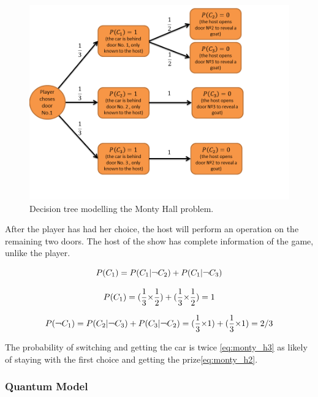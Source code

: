 \begin{figure}[h]
\centering 
\includegraphics[scale=0.35]{Figures/monty_hall_decision_tree.png}
\caption{Decision tree modelling the Monty Hall problem. }
\label{fig:monty_hall_tree}
\end{figure}

After the player has had her choice, the host will perform an operation on the remaining two doors. The host of the show has complete information of the game, unlike the player.

\begin{equation}
\label{eq:monty_h1}
P(C_{1})=P(C_{1}|\text{\textlnot}C_{2})+P(C_{1}|\text{\textlnot}C_{3})
\end{equation}


\begin{equation}
\label{eq:monty_h2}
P(C_{1})=(\frac{1}{3}\text{\texttimes}\frac{1}{2})+(\frac{1}{3}\text{\texttimes}\frac{1}{2})=1
\end{equation}


\begin{equation}
\label{eq:monty_h3}
P(\text{\textlnot}C_{1})=P(C_{2}|\text{\textlnot}C_{3})+P(C_{3}|\text{\textlnot}C_{2})=(\frac{1}{3}\text{\texttimes}1)+(\frac{1}{3}\text{\texttimes}1)=2/3
\end{equation}

The probability of switching and getting the car is twice \ref{eq:monty_h3} as likely of staying with the first choice and getting the prize\ref{eq:monty_h2}. 


\subsubsection{Quantum Model}


